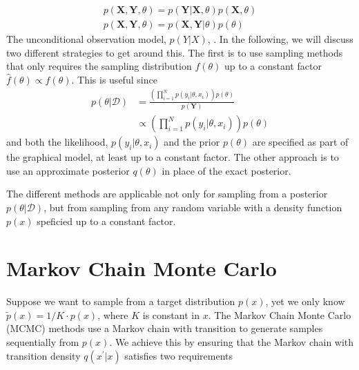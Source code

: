 \begin{align}
    p(\bm{X}, \bm{Y}, \theta) = p(\bm{Y} | \bm{X}, \theta) p(\bm{X}, \theta) \\
    p(\bm{X}, \bm{Y}, \theta) = p(\bm{X}, \bm{Y} | \theta) p(\theta) 
\end{align}
The unconditional observation model, $p(Y|X)$, . 
In the following, we will discuss two different strategies to get around this. 
The first is to use sampling methods that only requires the sampling distribution $f(\theta)$ up to a constant factor $\hat{f}(\theta)\propto f(\theta)$. 
This is useful since 
\begin{align*}
    p(\theta | \mathcal{D}) 
    &= \frac
    {\left(\prod_{i=1}^N p(y_i |\theta, x_i)\right) p(\theta)}
    {p(\bm{Y}) }  \\
    &\propto \left(\prod_{i=1}^N p(y_i |\theta, x_i)\right) p(\theta)
\end{align*}
and both the likelihood, $p(y_i |\theta, x_i)$ and the prior $p(\theta)$ are specified as part of the graphical model, at least up to a constant factor. 
The other approach is to use an approximate posterior $q(\theta)$ in place of the exact posterior. 

The different methods are applicable not only for sampling from a posterior $p(\theta | \mathcal{D})$, but from sampling from any random variable with a density function $p(x)$ speficied up to a constant factor.

\section{Markov Chain Monte Carlo}
Suppose we want to sample from a target distribution $p(x)$, yet we only know $\tilde{p}(x) = 1/K\cdot p(x)$, where $K$ is constant in $x$.
The Markov Chain Monte Carlo (MCMC) methods use a Markov chain with transition to generate samples sequentially from $p(x)$. 
We achieve this by ensuring that the Markov chain with transition density $q(x^\prime | x)$ satisfies two requirements

